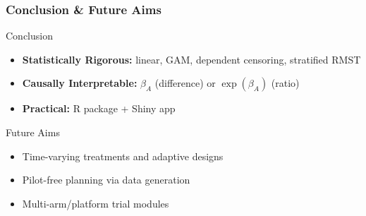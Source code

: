 \documentclass{beamer}
\begin{document}
\begin{frame}
\frametitle{Conclusion \& Future Aims}

\begin{block}{Conclusion}
\begin{itemize}
  \item \textbf{Statistically Rigorous:} linear, GAM, dependent censoring, stratified RMST
  \item \textbf{Causally Interpretable:} $\beta_A$ (difference) or $\exp(\beta_A)$ (ratio)
  \item \textbf{Practical:} R package + Shiny app
\end{itemize}
\end{block}

\begin{block}{Future Aims}
\begin{itemize}
  \item Time-varying treatments and adaptive designs
  \item Pilot-free planning via data generation
  \item Multi-arm/platform trial modules
\end{itemize}
\end{block}

\end{frame}
\end{document}
